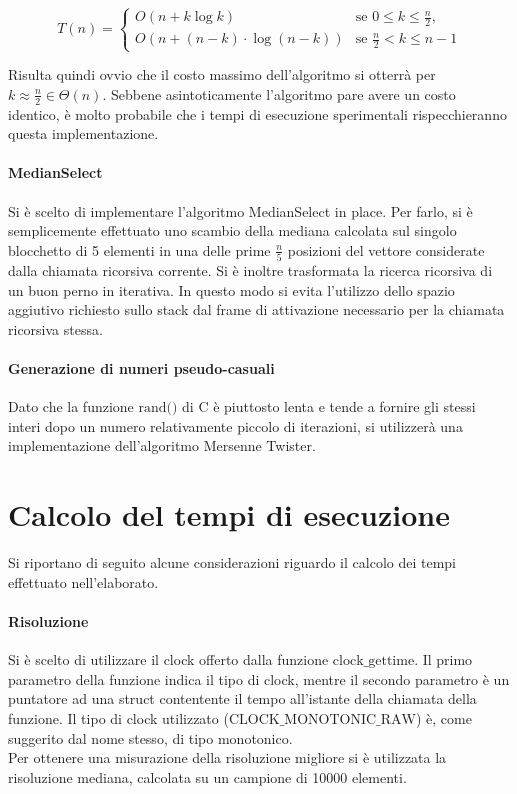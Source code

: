 \documentclass{article}
\begin{document}
	\[
		T\left(n\right) =
			\begin{cases}
				O\left(n + k\log{k}\right)  & \text{se $0\leq k \leq \frac{n}{2}$,} \\
				O\left(n + \left(n-k\right)\cdot\log{\left(n-k\right)}\right) & \text{se $\frac{n}{2} < k \leq n-1$} 
			\end{cases}
			\tag{1}
			\label{eq:heap}
	\]
	
	Risulta quindi ovvio che il costo massimo dell'algoritmo si otterrà per $k\approx \frac{n}{2} \in \Theta\left(n\right)$. Sebbene asintoticamente l'algoritmo pare avere un costo identico, è molto probabile che i tempi di esecuzione sperimentali rispecchieranno questa implementazione.
	
	\paragraph{MedianSelect} 
	Si è scelto di implementare l'algoritmo MedianSelect in place. Per farlo, si è semplicemente effettuato uno scambio della mediana calcolata sul singolo blocchetto di 5 elementi in una delle prime $\frac{n}{5}$ posizioni del vettore considerate dalla chiamata ricorsiva corrente. Si è inoltre trasformata la ricerca ricorsiva di un buon perno in iterativa. In questo modo si evita l'utilizzo dello spazio aggiutivo richiesto sullo stack dal frame di attivazione necessario per la chiamata ricorsiva stessa.
	
	\paragraph{Generazione di numeri pseudo-casuali}
	Dato che la funzione $\text{rand()}$ di C è piuttosto lenta e tende a fornire gli stessi interi dopo un numero relativamente piccolo di iterazioni, si utilizzerà una implementazione dell'algoritmo Mersenne Twister.
	
	\newpage
	\section{Calcolo del tempi di esecuzione}	
	Si riportano di seguito alcune	considerazioni riguardo il calcolo dei tempi effettuato nell'elaborato.
	
	\paragraph{Risoluzione}
	Si è scelto di utilizzare il clock offerto dalla funzione $\text{clock\_gettime}$. Il primo parametro della funzione indica il tipo di clock, mentre il secondo parametro è un puntatore ad una struct contentente il tempo all'istante della chiamata della funzione. Il tipo di clock utilizzato ($\text{CLOCK\_MONOTONIC\_RAW}$) è, come suggerito dal nome stesso, di tipo monotonico. \\ Per ottenere una misurazione della risoluzione migliore si è utilizzata la risoluzione mediana, calcolata su un campione di 10000 elementi.
	
\end{document}
